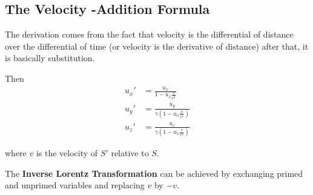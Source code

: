 \subsection{The Velocity -Addition Formula}

The derivation comes from the fact that velocity is the differential of distance over the differential of time (or velocity is the derivative of distance) after that, it is basically substitution.

Then 
\begin{align*}
    u_{x}' &= \frac{u_x}{1- u_{x} \frac{v}{c^2}} \\
    u_{y}' &= \frac{u_y}{\gamma(1 -u_{x} \frac{v}{c^2})} \\
     u_{z}' &= \frac{u_z}{\gamma(1 -u_{x} \frac{v}{c^2})}
\end{align*}

where \textbf{$v$} is the velocity of $S'$ relative to $S$. 

The \textbf{Inverse Lorentz Transformation} can be achieved by exchanging primed and unprimed variables and replacing $v$ by $-v$.